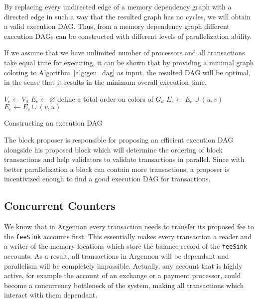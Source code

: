 \documentclass[11pt, A4]{report}
\begin{document}
    By replacing every undirected edge of a memory dependency graph with a directed edge in such a way that the
    resulted graph has no cycles, we will obtain a valid execution DAG. Thus, from a memory dependency graph different
    execution DAGs can be constructed with different levels of parallelization ability.

    If we assume that we have unlimited number of processors and all transactions take equal time for executing, it
    can be shown that by providing a minimal graph coloring to Algorithm~\ref{alg:gen_dag} as input, the resulted
    DAG will be optimal, in the sense that it results in the minimum overall execution time.

    \begin{algorithm}
        \DontPrintSemicolon
        \BlankLine
        $V_e \gets V_d$\;
        $E_e \gets \varnothing$\;
        define a total order on colors of $G_d$\;
        {
            {
                $E_e \gets E_e \cup (u,v)$\;
            }{
                $E_e \gets E_e \cup (v,u)$\;
            }
        }
        \caption{Constructing an execution DAG}\label{alg:gen_dag}
    \end{algorithm}

    The block proposer is responsible for proposing an efficient execution DAG alongside his proposed block which will
    determine the ordering of block transactions and help validators to validate transactions in parallel. Since with
    better parallelization a block can contain more transactions, a proposer is incentivized enough to find a good
    execution DAG for transactions.

    \subsection{Concurrent Counters}\label{subsec:concurrent-counters}

    We know that in Argennon every transaction needs to transfer its proposed fee to the \texttt{feeSink} accounts
    first. This essentially makes every transaction a reader and a writer of the memory locations which store the
    balance record of the \texttt{feeSink} accounts. As a result, all transactions in Argennon will be dependant and
    parallelism will be completely impossible. Actually, any account that is highly active, for example the account
    of an exchange or a payment processor, could become a concurrency bottleneck of the system, making all transactions
    which interact with them dependant.
\end{document}
